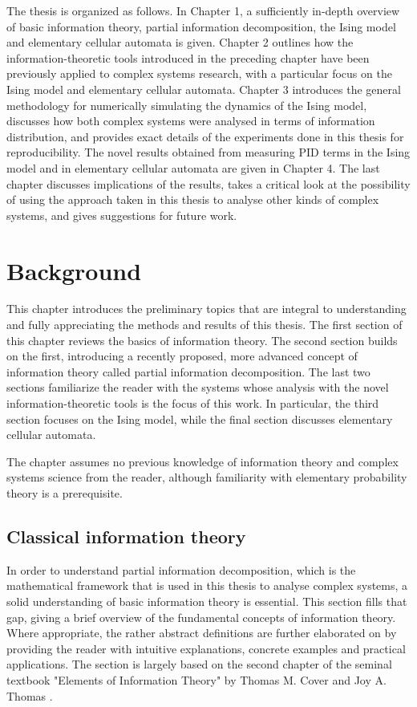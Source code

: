 \documentclass[12pt]{article}
\begin{document}
The thesis is organized as follows. In Chapter 1, a sufficiently in-depth overview of basic information theory, partial information decomposition, the Ising model and elementary cellular automata is given. Chapter 2 outlines how the information-theoretic tools introduced in the preceding chapter have been previously applied to complex systems research, with a particular focus on the Ising model and elementary cellular automata. Chapter 3 introduces the general methodology for numerically simulating the dynamics of the Ising model, discusses how both complex systems were analysed in terms of information distribution, and provides exact details of the experiments done in this thesis for reproducibility. The novel results obtained from measuring PID terms in the Ising model and in elementary cellular automata are given in Chapter 4. The last chapter discusses implications of the results, takes a critical look at the possibility of using the approach taken in this thesis to analyse other kinds of complex systems, and gives suggestions for future work.  

\newpage

\section{Background}

This chapter introduces the preliminary topics that are integral to understanding and fully appreciating the methods and results of this thesis. The first section of this chapter reviews the basics of information theory. The second section builds on the first, introducing a recently proposed, more advanced concept of information theory called partial information decomposition. The last two sections familiarize the reader with the systems whose analysis with the novel information-theoretic tools is the focus of this work. In particular, the third section focuses on the Ising model, while the final section discusses elementary cellular automata.

The chapter assumes no previous knowledge of information theory and complex systems science from the reader, although familiarity with elementary probability theory is a prerequisite. 

\subsection{Classical information theory}

In order to understand partial information decomposition, which is the mathematical framework that is used in this thesis to analyse complex systems, a solid understanding of basic information theory is essential. This section fills that gap, giving a brief overview of the fundamental concepts of information theory. Where appropriate, the rather abstract definitions are further elaborated on by providing the reader with intuitive explanations, concrete examples and practical applications. The section is largely based on the second chapter of the seminal textbook "Elements of Information Theory" by Thomas M. Cover and Joy A. Thomas \cite{cover-thomas}.
\end{document}

